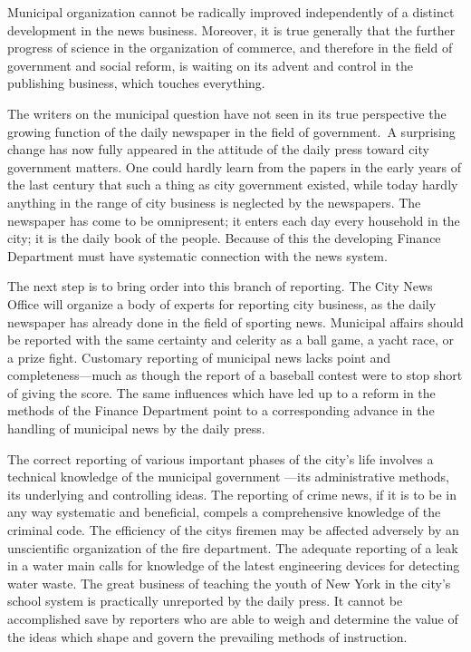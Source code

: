 \documentclass[openany,nobib]{tufte-book}
\begin{document}
Municipal organization cannot be radically improved independently of a
distinct development in the news business. Moreover, it is true
generally that the further progress of science in the organization of
commerce, and therefore in the field of government and social reform, is
waiting on its advent and control in the publishing business, which
touches everything.~

The writers on the municipal question have not seen in its true
perspective the growing function of the daily newspaper in the field of
government.~A surprising change has now fully appeared in the attitude
of the daily press toward city government matters. One could hardly
learn from the papers in the early years of the last century that such a
thing as city government existed, while today hardly anything in the
range of city business is neglected by the newspapers. The newspaper has
come to be omnipresent; it enters each day every household in the city;
it is the daily book of the people. Because of this the developing
Finance Department must have systematic connection with the news
system.~

The next step is to bring order into this branch of reporting. The City
News Office will organize a body of experts for reporting city business,
as the daily newspaper has already done in the field of sporting news.
Municipal affairs should be reported with the same certainty and
celerity as a ball game, a yacht race, or a prize fight. Customary
reporting of municipal news lacks point and completeness---much as
though the report of a baseball contest were to stop short of giving the
score. The same influences which have led up to a reform in the methods
of the Finance Department point to a corresponding advance in the
handling of municipal news by the daily press.~

The correct reporting of various important phases of the city's life
involves a technical knowledge of the municipal government ---its
administrative methods, its underlying and controlling ideas. The
reporting of crime news, if it is to be in any way systematic and
beneficial, compels a comprehensive knowledge of the criminal code. The
efficiency of the city\textquotesingle s firemen may be affected
adversely by an unscientific organization of the fire department. The
adequate reporting of a leak in a water main calls for knowledge of the
latest engineering devices for detecting water waste. The great business
of teaching the youth of New York in the city's school system is
practically unreported by the daily press. It cannot be accomplished
save by reporters who are able to weigh and determine the value of the
ideas which shape and govern the prevailing methods of instruction.~
\end{document}
